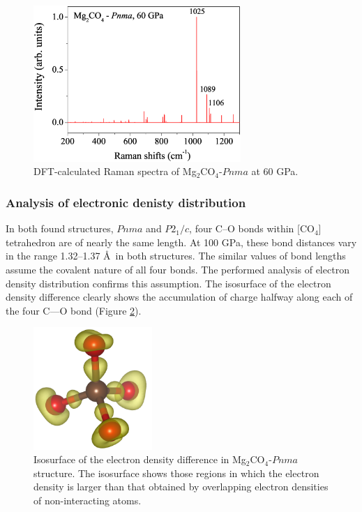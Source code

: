 \documentclass[a4paperm]{article}
\begin{document}
\begin{figure}[H]
	\includegraphics[width=0.7\textwidth]{raman_mg2co4} \centering
	\caption{DFT-calculated Raman spectra of Mg$_2$CO$_4$-$Pnma$ at 60 GPa.} \label{raman}
\end{figure}


\subsubsection*{Analysis of electronic denisty distribution}

In both found structures, $Pnma$ and $P2_1/c$, four C--O bonds within [CO$_4$] tetrahedron are of nearly the same length.
At 100 GPa, these bond distances vary in the range 1.32--1.37 \AA\ in both structures. 
The similar values of bond lengths assume the covalent nature of all four bonds.
The performed analysis of electron density distribution confirms this assumption.
The isosurface of the electron density difference clearly shows the accumulation of charge halfway along each of the four C—O bond (Figure \ref{diff}).


\begin{figure}[H]
	\includegraphics[width=0.4\textwidth]{dens_diff.png} \centering
	\caption{Isosurface of the electron density difference in Mg$_2$CO$_4$-$Pnma$ structure. The isosurface shows those regions in which the electron density is larger than that obtained by overlapping electron densities of non-interacting atoms.} \label{diff}
\end{figure}
\end{document}
